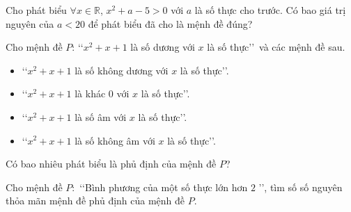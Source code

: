 \documentclass[12pt,a4paper,openany,oneside]{book}
\begin{document}
\begin{bt}%
	Cho phát biểu $\forall x\in\mathbb{R}$, $x^{2}+a-5>0$ với $a$ là số thực cho trước. Có bao giá trị  nguyên của $a<20$ để phát biểu đã cho là mệnh đề đúng?
\end{bt}

\begin{bt}%
	Cho mệnh đề $P$: \lq\lq $x^2+x+1$ là số dương với $x$ là số thực\rq\rq\ và các  mệnh đề sau.
	\begin{itemize}
		\item \lq\lq $x^2+x+1$  là số không dương với $x$ là số thực\rq\rq.
		\item \lq\lq $x^2+x+1$ là khác $0$ với $x$ là số thực\rq\rq. 
		\item \lq\lq $x^2+x+1$ là số âm với $x$ là số thực\rq\rq. 
		\item \lq\lq $x^2+x+1$  là số không âm với $x$ là số thực\rq\rq.
	\end{itemize}
	Có bao nhiêu phát biểu là phủ định của mệnh  đề $P$?
\end{bt}

\begin{bt}%
	Cho mệnh đề $P\colon$ \lq\lq Bình phương của một số thực lớn hơn $ 2 $ \rq\rq, tìm số số  nguyên thỏa mãn mệnh đề phủ định của mệnh đề $P$.
\end{bt}
\end{document}
